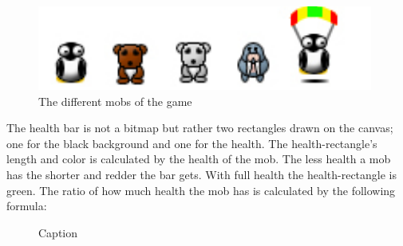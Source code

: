 \begin{figure}[h]
\begin{center}
\includegraphics[scale=0.6]{pics/chapters/chapter4/mobs}
\end{center}
\caption{The different mobs of the game}
\label{fig:mobs}
\end{figure}

The health bar is not a bitmap but rather two rectangles drawn on the canvas; one for the black background and one for the health. The health-rectangle's length and color is calculated by the health of the mob. The less health a mob has the shorter and redder the bar gets. With full health the health-rectangle is green. The ratio of how much health the mob has is calculated by the following formula:

\begin{figure}[htb]

\begin{small}

\end{small}

\caption{Caption}
\label{fig:codeExMobHealth}

\end{figure}
